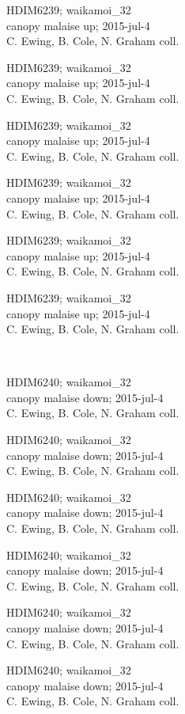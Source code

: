 \documentclass[2pt]{extarticle}
\begin{document}
\noindent
\parbox{0.16\textwidth}{\tiny \raggedright \rule[-0.3\baselineskip]{0pt}{10pt}HDIM6239; waikamoi\_32\\ canopy malaise up; 2015-jul-4\\ C. Ewing, B. Cole, N. Graham coll.}
\parbox{0.16\textwidth}{\tiny \raggedright \rule[-0.3\baselineskip]{0pt}{10pt}HDIM6239; waikamoi\_32\\ canopy malaise up; 2015-jul-4\\ C. Ewing, B. Cole, N. Graham coll.}
\parbox{0.16\textwidth}{\tiny \raggedright \rule[-0.3\baselineskip]{0pt}{10pt}HDIM6239; waikamoi\_32\\ canopy malaise up; 2015-jul-4\\ C. Ewing, B. Cole, N. Graham coll.}
\parbox{0.16\textwidth}{\tiny \raggedright \rule[-0.3\baselineskip]{0pt}{10pt}HDIM6239; waikamoi\_32\\ canopy malaise up; 2015-jul-4\\ C. Ewing, B. Cole, N. Graham coll.}
\parbox{0.16\textwidth}{\tiny \raggedright \rule[-0.3\baselineskip]{0pt}{10pt}HDIM6239; waikamoi\_32\\ canopy malaise up; 2015-jul-4\\ C. Ewing, B. Cole, N. Graham coll.}
\parbox{0.16\textwidth}{\tiny \raggedright \rule[-0.3\baselineskip]{0pt}{10pt}HDIM6239; waikamoi\_32\\ canopy malaise up; 2015-jul-4\\ C. Ewing, B. Cole, N. Graham coll.} \\ 
\vspace{0.001in} 

\noindent
\parbox{0.16\textwidth}{\tiny \raggedright \rule[-0.3\baselineskip]{0pt}{10pt}HDIM6240; waikamoi\_32\\ canopy malaise down; 2015-jul-4\\ C. Ewing, B. Cole, N. Graham coll.}
\parbox{0.16\textwidth}{\tiny \raggedright \rule[-0.3\baselineskip]{0pt}{10pt}HDIM6240; waikamoi\_32\\ canopy malaise down; 2015-jul-4\\ C. Ewing, B. Cole, N. Graham coll.}
\parbox{0.16\textwidth}{\tiny \raggedright \rule[-0.3\baselineskip]{0pt}{10pt}HDIM6240; waikamoi\_32\\ canopy malaise down; 2015-jul-4\\ C. Ewing, B. Cole, N. Graham coll.}
\parbox{0.16\textwidth}{\tiny \raggedright \rule[-0.3\baselineskip]{0pt}{10pt}HDIM6240; waikamoi\_32\\ canopy malaise down; 2015-jul-4\\ C. Ewing, B. Cole, N. Graham coll.}
\parbox{0.16\textwidth}{\tiny \raggedright \rule[-0.3\baselineskip]{0pt}{10pt}HDIM6240; waikamoi\_32\\ canopy malaise down; 2015-jul-4\\ C. Ewing, B. Cole, N. Graham coll.}
\parbox{0.16\textwidth}{\tiny \raggedright \rule[-0.3\baselineskip]{0pt}{10pt}HDIM6240; waikamoi\_32\\ canopy malaise down; 2015-jul-4\\ C. Ewing, B. Cole, N. Graham coll.} \\ 
\vspace{0.001in} 
\end{document}
